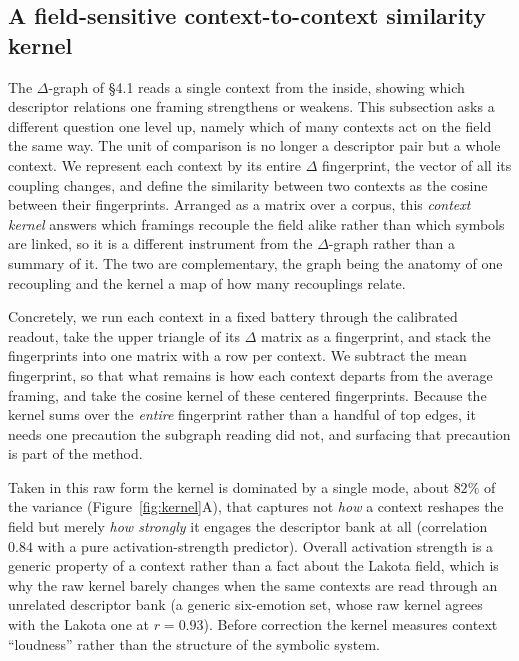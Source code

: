 \documentclass[final,creativeai]{article}
\begin{document}
\subsection{A field-sensitive context-to-context similarity kernel}
The $\Delta$-graph of \S4.1 reads a single context from the inside, showing which descriptor relations one framing strengthens or weakens. This subsection asks a different question one level up, namely which of many contexts act on the field the same way. The unit of comparison is no longer a descriptor pair but a whole context. We represent each context by its entire $\Delta$ fingerprint, the vector of all its coupling changes, and define the similarity between two contexts as the cosine between their fingerprints. Arranged as a matrix over a corpus, this \emph{context kernel} answers which framings recouple the field alike rather than which symbols are linked, so it is a different instrument from the $\Delta$-graph rather than a summary of it. The two are complementary, the graph being the anatomy of one recoupling and the kernel a map of how many recouplings relate.

Concretely, we run each context in a fixed battery through the calibrated readout, take the upper triangle of its $\Delta$ matrix as a fingerprint, and stack the fingerprints into one matrix with a row per context. We subtract the mean fingerprint, so that what remains is how each context departs from the average framing, and take the cosine kernel of these centered fingerprints. Because the kernel sums over the \emph{entire} fingerprint rather than a handful of top edges, it needs one precaution the subgraph reading did not, and surfacing that precaution is part of the method.

Taken in this raw form the kernel is dominated by a single mode, about $82\%$ of the variance (Figure~\ref{fig:kernel}A), that captures not \emph{how} a context reshapes the field but merely \emph{how strongly} it engages the descriptor bank at all (correlation $0.84$ with a pure activation-strength predictor). Overall activation strength is a generic property of a context rather than a fact about the Lakota field, which is why the raw kernel barely changes when the same contexts are read through an unrelated descriptor bank (a generic six-emotion set, whose raw kernel agrees with the Lakota one at $r=0.93$). Before correction the kernel measures context ``loudness'' rather than the structure of the symbolic system.
\end{document}
